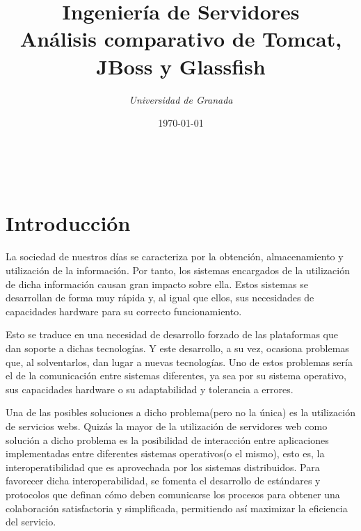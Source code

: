 \documentclass[a4paper, 10pt]{article}
\title{\textbf{Ingeniería de Servidores}\\ %
Análisis comparativo de Tomcat, JBoss y Glassfish} %
\author{ %
{\textit{Universidad de Granada}}} %
\date{\today} %
\makeatletter
\renewcommand{\maketitle}{
  \begin{flushright} %
  
  {\LARGE\@title} %
  
  \vspace{50pt} %
  
  {\large\@author} %
  \\\@date %
  \vspace{40pt} %
  \end{flushright}
}
\makeatother
\begin{document}
\maketitle %

\renewcommand{\abstractname}{Resumen} %
\begin{abstract}
\end{abstract}





\section{Introducción}

	La sociedad de nuestros días se caracteriza por la obtención, almacenamiento y utilización de la información. Por tanto, los sistemas encargados de la utilización de dicha información causan gran impacto sobre ella. Estos sistemas se desarrollan de forma muy rápida y, al igual que ellos, sus necesidades de capacidades hardware para su correcto funcionamiento.
	
	Esto se traduce en una necesidad de desarrollo forzado de las plataformas que dan soporte a dichas tecnologías. Y este desarrollo, a su vez, ocasiona problemas que, al solventarlos, dan lugar a nuevas tecnologías. Uno de estos problemas sería el de la comunicación entre sistemas diferentes, ya sea por su sistema operativo, sus capacidades hardware o su adaptabilidad y tolerancia a errores.
	
	Una de las posibles soluciones a dicho problema(pero no la única) es la utilización de servicios webs. Quizás la mayor de la utilización de servidores web como solución a dicho problema es la posibilidad de interacción entre aplicaciones implementadas entre diferentes sistemas operativos(o el mismo), esto es, la interoperatibilidad que es aprovechada por los sistemas distribuidos. Para favorecer dicha interoperabilidad, se fomenta el desarrollo de estándares y protocolos que definan cómo deben comunicarse los procesos para obtener una colaboración satisfactoria y simplificada, permitiendo así maximizar la eficiencia del servicio.
	
\end{document}

